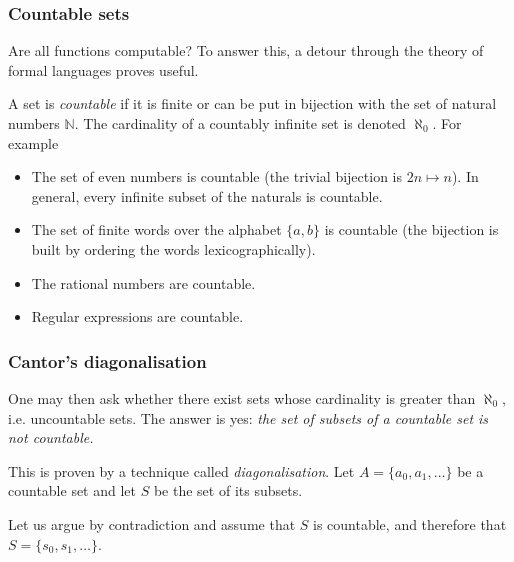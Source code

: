 \documentclass[compress,dvipdfmx]{beamer}
\begin{document}
%
\begin{frame}
\frametitle{Countable sets}

Are all functions computable? To answer this, a detour through the
theory of formal languages proves useful.

\bigskip

A set is \emph{countable} if it is finite or can be put in
bijection with the set of natural numbers $\mathbb{N}$. The
cardinality of a countably infinite set is denoted $\aleph_0$. For
example
\begin{itemize}

  \item The set of even numbers is countable (the trivial bijection
  is $2n \mapsto n$). In general, every infinite subset of the
  naturals is countable.

  \item The set of finite words over the alphabet $\{a,b\}$ is
  countable (the bijection is built by ordering the words
  lexicographically).

  \item The rational numbers are countable.

  \item Regular expressions are countable.

\end{itemize}

\end{frame}

%
\begin{frame}
\frametitle{Cantor's diagonalisation}

One may then ask whether there exist sets whose cardinality is greater
than $\aleph_0$, i.e. uncountable sets. The answer is yes: \emph{the
set of subsets of a countable set is not countable.}

\bigskip

This is proven by a technique called \emph{diagonalisation}. Let
$A = \{a_0, a_1, \ldots\}$ be a countable set and let $S$ be the set
of its subsets.

\bigskip

Let us argue by contradiction and assume that $S$ is countable, and
therefore that $S = \{s_0, s_1, \ldots\}$.

\end{frame}
\end{document}
